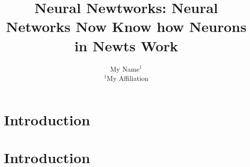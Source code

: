 






\title{Neural Newtworks: Neural Networks Now Know how Neurons in Newts Work}
\author{
    My Name$^1$\\
    \affiliations
    $^1$My Affiliation
}



\maketitle

\begin{abstract}
    
\end{abstract}

\section{Introduction}
    
\section{Introduction}




